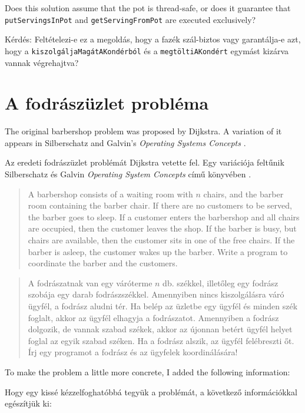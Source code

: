 \documentclass{book}
\newcommand{\clearemptydoublepage}{\newpage\cleardoublepage}
\begin{document}
Does this solution assume that the pot is thread-safe, or does it
guarantee that {\tt putServingsInPot} and {\tt getServingFromPot}
are executed exclusively?

Kérdés: 
Feltételezi-e ez a megoldás, hogy a fazék szál-biztos vagy
garantálja-e azt, hogy a {\tt kiszolgáljaMagátAKondérból} és a {\tt megtöltiAKondért}
egymást kizárva vannak végrehajtva?

\clearemptydoublepage
\section{A fodrászüzlet probléma}

The original barbershop problem was proposed by
Dijkstra.  A variation of it appears in 
Silberschatz and Galvin's {\em Operating Systems Concepts}
\cite{silberschatz}.

Az eredeti fodrászüzlet problémát Dijkstra vetette fel.
Egy variációja feltűnik Silberschatz és Galvin
{\em Operating System Concepts} című könyvében \cite{silberschatz}.

\begin{quotation}
A barbershop consists of a waiting room with $n$ chairs, and the
barber room containing the barber chair.  If there are no customers to
be served, the barber goes to sleep.  If a customer enters the
barbershop and all chairs are occupied, then the customer leaves the
shop.  If the barber is busy, but chairs are available, then the
customer sits in one of the free chairs.  If the barber is asleep, the
customer wakes up the barber.  Write a program to coordinate the
barber and the customers.
\end{quotation}

\begin{quotation}
A fodrászatnak van egy váróterme $n$ db. székkel, illetőleg
egy fodrász szobája egy darab fodrászszékkel. Amennyiben
nincs kiszolgálásra váró ügyfél, a fodrász aludni tér.
Ha belép az üzletbe egy ügyfél és minden szék foglalt,
akkor az ügyfél elhagyja a fodrászatot. Amennyiben a fodrász dolgozik,
de vannak szabad székek, akkor az újonnan betért ügyfél helyet foglal
az egyik szabad széken. Ha a fodrász alszik, az ügyfél felébreszti őt.
Írj egy programot a fodrász és az ügyfelek koordinálására!
\end{quotation}

To make the problem a little more concrete, I added the
following information:

Hogy egy kissé kézzelfoghatóbbá tegyük a problémát, a következő
információkkal egészítjük ki:
\end{document}
